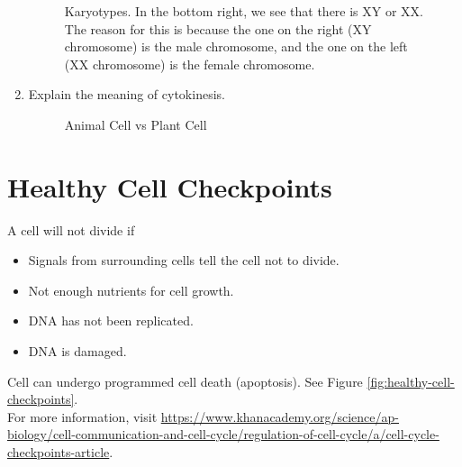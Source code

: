 \documentclass[12pt]{report}
\begin{document}
\begin{enumerate}
\begin{solution}
\begin{figure}[H]
                    \caption{Karyotypes. In the bottom right, we see that there is XY or XX. The reason for this is because the one on the right (XY chromosome) is the male chromosome, and the one on the left (XX chromosome) is the female chromosome.}
                \end{figure}
            \end{solution}

            \item{Explain the meaning of cytokinesis.}
\begin{figure}[ht]
    \centering
    \caption{Animal Cell vs Plant Cell}
    \label{fig:animal-cell}
\end{figure}
\end{enumerate}

\section{Healthy Cell Checkpoints}
\begin{definition}
    A cell will not divide if 
    \begin{itemize}
        \item{Signals from surrounding cells tell the cell not to divide.}
        \item{Not enough nutrients for cell growth.}
        \item{DNA has not been replicated.}
        \item{DNA is damaged.}
    \end{itemize}
    Cell can undergo programmed cell death (apoptosis). See Figure \ref{fig:healthy-cell-checkpoints}. \\

    For more information, visit \url{https://www.khanacademy.org/science/ap-biology/cell-communication-and-cell-cycle/regulation-of-cell-cycle/a/cell-cycle-checkpoints-article}.
\end{definition}
\end{document}

